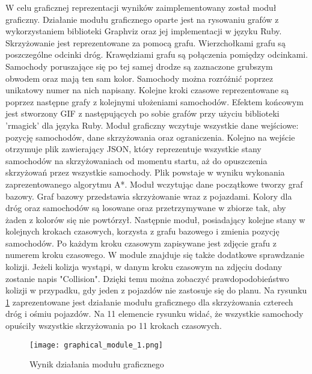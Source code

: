 W celu graficznej reprezentacji wyników zaimplementowany został moduł graficzny. Działanie modułu graficznego oparte jest na rysowaniu grafów z wykorzystaniem biblioteki Graphviz oraz jej implementacji w języku Ruby. Skrzyżowanie jest reprezentowane za pomocą grafu. Wierzchołkami grafu są poszczególne odcinki dróg. Krawędziami grafu są połączenia pomiędzy odcinkami. Samochody poruszające się po tej samej drodze są zaznaczone grubszym obwodem oraz mają ten sam kolor. Samochody można rozróżnić poprzez unikatowy numer na nich napisany. Kolejne kroki czasowe reprezentowane są poprzez następne grafy z kolejnymi ułożeniami samochodów. Efektem końcowym jest stworzony GIF z następujących po sobie grafów przy użyciu biblioteki 'rmagick' dla języka Ruby.
\newline
\indent
Moduł graficzny wczytuje wszystkie dane wejściowe: pozycję samochodów, dane skrzyżowania oraz ograniczenia. Kolejno na wejście otrzymuje plik zawierający JSON, który reprezentuje wszystkie stany samochodów na skrzyżowaniach od momentu startu, aż do opuszczenia skrzyżowań przez wszystkie samochody. Plik powstaje w wyniku wykonania zaprezentowanego algorytmu A*. Moduł wczytując dane początkowe tworzy graf bazowy. Graf bazowy przedstawia skrzyżowanie wraz z pojazdami. Kolory dla dróg oraz samochodów są losowane oraz przetrzymywane w zbiorze tak, aby żaden z kolorów się nie powtórzył. Następnie moduł, posiadający kolejne stany w kolejnych krokach czasowych, korzysta z grafu bazowego i zmienia pozycję samochodów. Po każdym kroku czasowym zapisywane jest zdjęcie grafu z numerem kroku czasowego.
\newline
\indent
W module znajduje się także dodatkowe sprawdzanie kolizji. Jeżeli kolizja wystąpi, w danym kroku czasowym na zdjęciu dodany zostanie napis "Collision". Dzięki temu można zobaczyć prawdopodobieństwo kolizji w przypadku, gdy jeden z pojazdów nie zastosuje się do planu.
\newline
\indent
Na rysunku \ref{graphical-framework} zaprezentowane jest działanie modułu graficznego dla skrzyżowania czterech dróg i ośmiu pojazdów. Na 11 elemencie rysunku widać, że wszystkie samochody opuściły wszystkie skrzyżowania po 11 krokach czasowych.
\begin{figure}[H]
    \texttt{[image: graphical\_module\_1.png]}
  \caption{Wynik działania modułu graficznego}
  \label{graphical-framework}
\end{figure}
\newpage
